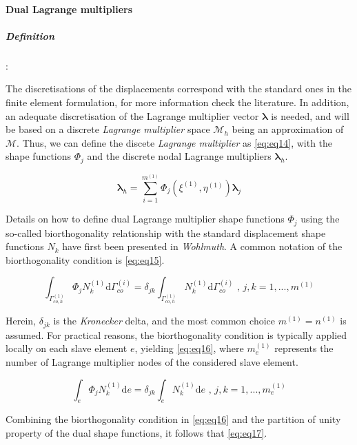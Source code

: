 \documentclass[a4paper,10pt]{article} %
\begin{document}
\paragraph{Dual Lagrange multipliers}

\subparagraph{Definition}:

The discretisations of the displacements correspond with the standard ones in the finite element formulation, for more information check the literature\cite{Zienkiewicz1}. In addition, an adequate discretisation of the Lagrange multiplier vector $\boldsymbol{\lambda}$ is needed, and will be based on a discrete \textit{Lagrange multiplier} space $\mathcal{M}_h$ being an approximation of $\mathcal{M}$. Thus, we can define the discete \textit{Lagrange multiplier} as \eqref{eq:eq14}, with the shape functions $\Phi_j$ and the discrete nodal Lagrange multipliers $\boldsymbol{\lambda}_h$.

\begin{equation}\label{eq:eq14}
 \boldsymbol{\lambda}_h = \sum_{i=1}^{m^{(1)}} \Phi_j\left(\xi^{(1)},\eta^{(1)} \right) \boldsymbol{\lambda}_j
\end{equation}

Details on how to define dual Lagrange multiplier shape functions $\Phi_j$ using the so-called biorthogonality relationship with the standard displacement shape functions $N_k$ have first been presented in \textit{Wohlmuth}\cite{wohlmuth}. A common notation of the biorthogonality condition is \eqref{eq:eq15}.

\begin{equation}\label{eq:eq15}
 \int_{\Gamma_{co,h}^{(1)}}\Phi_j N_k^{(1)} \text{d}\Gamma_{co}^{(i)} = \delta_{jk} \int_{\Gamma_{co,h}^{(1)}} N_k^{(1)} \text{d}\Gamma_{co}^{(i)} \text{ , } j,k=1,...,m^{(1)}
\end{equation}

Herein, $\delta_{jk}$ is the \textit{Kronecker} delta, and the most common choice $m^{(1)} = n^{(1)}$ is assumed. For
practical reasons, the biorthogonality condition is typically applied locally on each slave element $e$, yielding \eqref{eq:eq16}, where $m_e^{(1)}$ represents the number of Lagrange multiplier nodes of the considered slave element.

\begin{equation}\label{eq:eq16}
 \int_{e}\Phi_j N_k^{(1)} \text{d}e = \delta_{jk} \int_{e} N_k^{(1)} \text{d}e \text{ , } j,k=1,...,m_e^{(1)}
\end{equation}

Combining the biorthogonality condition in \eqref{eq:eq16} and the partition of unity property of the dual shape functions, it follows that \eqref{eq:eq17}.
\end{document}
